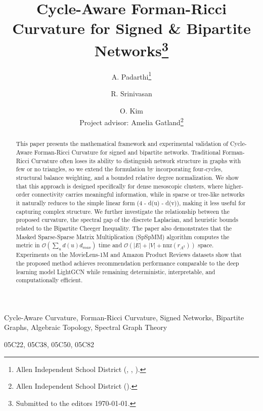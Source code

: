 \documentclass{siuro250211}
\title{Cycle-Aware Forman-Ricci Curvature for Signed \& Bipartite Networks\thanks{Submitted to the editors \today.}}
\author{A. Padarthi\thanks{Allen Independent School District (\email{aryan.padarthi@student.allenisd.org}, \email{raghav.srinivasan@student.allenisd.org}, \email{olivia.kim@student.allenisd.org}).} \and R. Srinivasan\footnotemark[2] \and O. Kim\footnotemark[2] \\ Project advisor: Amelia Gatland\thanks{Allen Independent School District (\email{amelia.gatland@allenisd.org}).}}
\theoremstyle{remark}
\theoremstyle{plain}
\begin{document}
\maketitle

\begin{abstract}
This paper presents the mathematical framework and experimental validation of Cycle-Aware Forman-Ricci Curvature for signed and bipartite networks. Traditional Forman-Ricci Curvature often loses its ability to distinguish network structure in graphs with few or no triangles, so we extend the formulation by incorporating four-cycles, structural balance weighting, and a bounded relative degree normalization. We show that this approach is designed specifically for dense mesoscopic clusters, where higher-order connectivity carries meaningful information, while in sparse or tree-like networks it naturally reduces to the simple linear form (4 - d(u) - d(v)), making it less useful for capturing complex structure. We further investigate the relationship between the proposed curvature, the spectral gap of the discrete Laplacian, and heuristic bounds related to the Bipartite Cheeger Inequality. The paper also demonstrates that the Masked Sparse-Sparse Matrix Multiplication (SpSpMM) algorithm computes the metric in $\mathcal{O}(\sum_u d(u) d_{max})$ time and $\mathcal{O}(|E| + |V| + \mathrm{nnz}(r_{A^2}))$ space. Experiments on the MovieLens-1M and Amazon Product Reviews datasets show that the proposed method achieves recommendation performance comparable to the deep learning model LightGCN while remaining deterministic, interpretable, and computationally efficient. 
\end{abstract}

\begin{keywords}
Cycle-Aware Curvature, Forman-Ricci Curvature, Signed Networks, Bipartite Graphs, Algebraic Topology, Spectral Graph Theory
\end{keywords}

\begin{AMS}
05C22, 05C38, 05C50, 05C82
\end{AMS}
\end{document}
